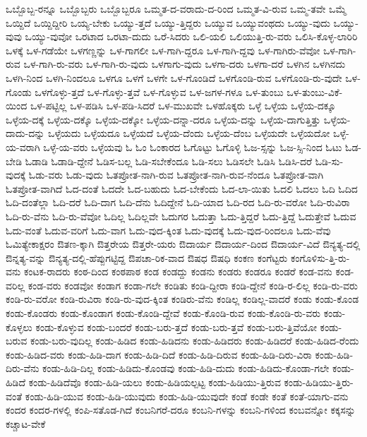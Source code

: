 {ಒಬ್ಬೊಬ್ಬ-ರನ್ನೂ
ಒಬ್ಬೊಬ್ಬರು
ಒಬ್ಬೊಬ್ಬರೂ
ಒಮ್ಮತ-ದ-ವರಾದು-ದ-ರಿಂದ
ಒಮ್ಮತ-ವಿ-ರುವ
ಒಮ್ಮ-ತವೇ
ಒಮ್ಮೆ
ಒಯ್ದಿದೆ
ಒಯ್ದಿದ್ದೀರಿ
ಒಯ್ಯ-ಬೇಕು
ಒಯ್ಯು-ತ್ತದೆ
ಒಯ್ಯು-ತ್ತಿದ್ದರು
ಒಯ್ಯುವ
ಒಯ್ಯುವಂಥದು
ಒಯ್ಯು-ವುದು
ಒಯ್ಯು-ವುವು
ಒಯ್ಯು-ವುವೋ
ಒರಟಾದ
ಒರಟಾ-ದುದು
ಒರೆ-ಸಿದರು
ಒಲಿ-ಯಲಿ
ಒಲಿಯುತ್ತಿ-ರು-ವರು
ಒಲಿಸಿ-ಕೊಳ್ಳ-ಲಾರಿರಿ
ಒಳಕ್ಕೆ
ಒಳ-ಗಡೆಯೇ
ಒಳಗಣ್ಣನ್ನು
ಒಳ-ಗಾಗಲೀ
ಒಳ-ಗಾಗಿ-ದ್ದರೂ
ಒಳ-ಗಾಗಿ-ದ್ದವು
ಒಳ-ಗಾಗಿರು-ವೆವೋ
ಒಳ-ಗಾಗಿ-ರುವ
ಒಳ-ಗಾಗಿ-ರು-ವರು
ಒಳ-ಗಾಗಿ-ರು-ವುದು
ಒಳಗಾಗು-ವುದು
ಒಳಗಾ-ದರು
ಒಳಗಾ-ದರೆ
ಒಳಗಿನ
ಒಳಗಿನದು
ಒಳಗಿ-ನಿಂದ
ಒಳಗಿ-ನಿಂದಲೂ
ಒಳಗೂ
ಒಳಗೆ
ಒಳಗೇ
ಒಳ-ಗೊಂಡಿದೆ
ಒಳಗೊಂಡಿ-ರುವ
ಒಳಗೊಂಡಿ-ರು-ವುದೇ
ಒಳ-ಗೊಂಡು
ಒಳಗೊಳ್ಳು-ತ್ತದೆ
ಒಳ-ಗೊಳ್ಳು-ತ್ತವೆ
ಒಳ-ಗೊಳ್ಳುವ
ಒಳ-ಜಗಳ-ಗಳೂ
ಒಳ-ತುಂಬು
ಒಳ-ತುಂಬು-ವಿಕೆ-ಯಿಂದ
ಒಳ-ಪಟ್ಟಿಲ್ಲ
ಒಳ-ಪಡಿಸಿ
ಒಳ-ಪಡಿ-ಸಿದರೆ
ಒಳ-ಮುಖವೇ
ಒಳಹೊಕ್ಕರು
ಒಳ್ಳೆ
ಒಳ್ಳೆಯ
ಒಳ್ಳೆಯ-ದಕ್ಕೂ
ಒಳ್ಳೆಯ-ದಕ್ಕೆ
ಒಳ್ಳೆಯ-ದಕ್ಕೊ
ಒಳ್ಳೆಯ-ದಕ್ಕೋ
ಒಳ್ಳೆಯ-ದನ್ನಾ-ದರೂ
ಒಳ್ಳೆಯ-ದನ್ನು
ಒಳ್ಳೆಯ-ದಾಗುತ್ತಿತ್ತು
ಒಳ್ಳೆಯ-ದಾದು-ದನ್ನು
ಒಳ್ಳೆಯದು
ಒಳ್ಳೆಯದೂ
ಒಳ್ಳೆಯದೆ
ಒಳ್ಳೆಯ-ದೆಂದು
ಒಳ್ಳೆಯ-ದೆಂಬ
ಒಳ್ಳೆಯದೇ
ಒಳ್ಳೆಯದೋ
ಒಳ್ಳೆ-ಯ-ವರಾಗಿ
ಒಳ್ಳೆ-ಯ-ವರು
ಒಳ್ಳೆಯವು
ಓ
ಓಂ
ಓಂಕಾರದ
ಓಗೊಟ್ಟು
ಓಗೊಳ್ಳಿ
ಓಜ-ಸ್ಸನ್ನು
ಓಜ-ಸ್ಸಿ-ನಿಂದ
ಓಟು
ಓಡ-ಬೇಡಿ
ಓಡಾಡಿ
ಓಡಾಡಿ-ದ್ದೇನೆ
ಓಡಿಸ-ಬಲ್ಲ
ಓಡಿ-ಸಬೇಕೆಂದೂ
ಓಡಿ-ಸಲು
ಓಡಿಸಲೇ
ಓಡಿಸಿ
ಓಡಿಸಿ-ದರೆ
ಓಡಿ-ಸು-ವುದಕ್ಕೆ
ಓಡು-ವರು
ಓಡು-ವುದು
ಓತಪ್ರೋತ-ನಾಗಿ-ರುವ
ಓತಪ್ರೋತ-ನಾಗಿ-ರುವ-ನೆಂದೂ
ಓತಪ್ರೋತ-ವಾಗಿ
ಓತಪ್ರೋತ-ವಾಗಿದೆ
ಓದ-ದಂತೆ
ಓದದೇ
ಓದ-ಬಹುದು
ಓದ-ಬೇಕೆಂದು
ಓದ-ಲಾ-ಯಿತು
ಓದಲಿ
ಓದಲು
ಓದಿ
ಓದಿದ
ಓದಿ-ದಂತೆಲ್ಲಾ
ಓದಿ-ದರೆ
ಓದಿ-ದಾಗ
ಓದಿ-ದೆನು
ಓದಿದ್ದೇನೆ
ಓದಿ-ಯಾದ
ಓದಿ-ರದ
ಓದಿ-ರು-ವರೋ
ಓದಿ-ರುವಿರಾ
ಓದಿ-ರು-ವೆನು
ಓದಿ-ರು-ವೆವೋ
ಓದಿಲ್ಲ
ಓದಿಲ್ಲವೇ
ಓದುಗರ
ಓದುತ್ತಾ
ಓದು-ತ್ತಿದ್ದರೆ
ಓದು-ತ್ತಿದ್ದೆ
ಓದುತ್ತೇವೆ
ಓದುವ
ಓದು-ವಂತೆ
ಓದುವ-ವರಿಗೆ
ಓದು-ವಾಗ
ಓದು-ವುದ-ಕ್ಕಿಂತ
ಓದು-ವುದಕ್ಕೆ
ಓದು-ವುದ-ರಿಂದಲೂ
ಓದು-ವೆವು
ಓಮಿತ್ಯೇಕಾಕ್ಷರಂ
ಔತಣ-ಕ್ಕಾಗಿ
ಔತ್ತರೇಯ
ಔತ್ತರೇ-ಯರು
ಔದಾರ್ಯ
ಔದಾರ್ಯ-ದಿಂದ
ಔದಾರ್ಯ-ವಿದೆ
ಔನ್ಯತ್ಯ-ದಲ್ಲಿ
ಔನ್ನತ್ಯ-ವನ್ನು
ಔನ್ಯತ್ಯ-ದಲ್ಲಿ-ಹೆಪ್ಪುಗಟ್ಟಿದ್ದ
ಔಪಚಾ-ರಿಕ-ವಾದ
ಔಷಧ
ಔಷಧಿ
ಕಂಕಣ
ಕಂಗೆಟ್ಟರು
ಕಂಗೊಳಿಸು-ತ್ತಿ-ರು-ವನು
ಕಂಟಕ-ರಾದರು
ಕಂಠ-ದಿಂದ
ಕಂಠಪಾಠ
ಕಂಡ
ಕಂಡದ್ದು
ಕಂಡನು
ಕಂಡರು
ಕಂಡರೂ
ಕಂಡರೆ
ಕಂಡ-ವನು
ಕಂಡ-ವರಿಲ್ಲ
ಕಂಡ-ವರು
ಕಂಡವೋ
ಕಂಡಾಗ
ಕಂಡಾ-ಗಲೇ
ಕಂಡಿತು
ಕಂಡಿ-ದ್ದೀರಾ
ಕಂಡಿ-ದ್ದೇನೆ
ಕಂಡಿ-ರ-ಲಿಲ್ಲ
ಕಂಡಿ-ರು-ವರು
ಕಂಡಿ-ರು-ವರೋ
ಕಂಡಿ-ರುವಿರಾ
ಕಂಡಿ-ರು-ವುದ-ಕ್ಕಿಂತ
ಕಂಡಿರು-ವೆನು
ಕಂಡಿಲ್ಲ
ಕಂಡಿಲ್ಲ-ವಾದರೆ
ಕಂಡು
ಕಂಡು-ಕೊಂಡ
ಕಂಡು-ಕೊಂಡರು
ಕಂಡು-ಕೊಂಡಾಗ
ಕಂಡು-ಕೊಂಡಿ-ದ್ದೇವೆ
ಕಂಡು-ಕೊಂಡಿ-ರುವ
ಕಂಡು-ಕೊಂಡಿ-ರು-ವರು
ಕಂಡು-ಕೊಳ್ಳಲು
ಕಂಡು-ಕೊಳ್ಳುವ
ಕಂಡು-ಬಂದರೆ
ಕಂಡು-ಬರು-ತ್ತದೆ
ಕಂಡು-ಬರು-ತ್ತವೆ
ಕಂಡು-ಬರು-ತ್ತಿವೆಯೋ
ಕಂಡು-ಬರುವ
ಕಂಡು-ಬರು-ವುದಿಲ್ಲ
ಕಂಡು-ಹಿಡಿದ
ಕಂಡು-ಹಿಡಿದನು
ಕಂಡು-ಹಿಡಿದರು
ಕಂಡು-ಹಿಡಿದರೆ
ಕಂಡು-ಹಿಡಿದ-ರೆಂದು
ಕಂಡು-ಹಿಡಿದ-ವರು
ಕಂಡು-ಹಿಡಿ-ದಾಗ
ಕಂಡು-ಹಿಡಿ-ದಿದೆ
ಕಂಡು-ಹಿಡಿ-ದಿರುವ
ಕಂಡು-ಹಿಡಿ-ದಿರು-ವಿರಾ
ಕಂಡು-ಹಿಡಿ-ದಿರು-ವೆನು
ಕಂಡು-ಹಿಡಿ-ದಿಲ್ಲ
ಕಂಡು-ಹಿಡಿದು-ಕೊಂಡವು
ಕಂಡು-ಹಿಡಿ-ದುದು
ಕಂಡು-ಹಿಡಿದು-ಕೊಂಡಾ-ಗಲೇ
ಕಂಡು-ಹಿಡಿದೆ
ಕಂಡು-ಹಿಡಿದೆವೊ
ಕಂಡು-ಹಿಡಿ-ಯಲು
ಕಂಡು-ಹಿಡಿಯಲ್ಪಟ್ಟ
ಕಂಡು-ಹಿಡಿಯು-ತ್ತಿರುವ
ಕಂಡು-ಹಿಡಿಯು-ತ್ತಿರು-ವಂತೆ
ಕಂಡು-ಹಿಡಿ-ಯುವ
ಕಂಡು-ಹಿಡಿ-ಯುವುದು
ಕಂಡು-ಹಿಡಿ-ಯುವುದೇ
ಕಂಡೆ
ಕಂಡೇ
ಕಂತೆ
ಕಂತೆ-ಯಾಗು-ವನು
ಕಂದರ
ಕಂದರ-ಗಳಲ್ಲಿ
ಕಂಪಿ-ಸತೊಡ-ಗಿದೆ
ಕಂಬನಿಗರೆ-ದರೂ
ಕಂಬನಿ-ಗಳನ್ನು
ಕಂಬನಿ-ಗಳಿಂದ
ಕಂಬವನ್ನೋ
ಕಕ್ಕಸನ್ನು
ಕಚ್ಚಾಟ-ವೇಕೆ
}
